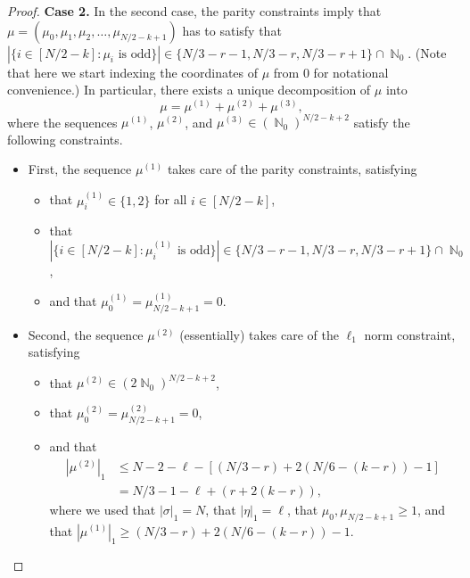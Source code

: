 \documentclass[11pt]{article}
\numberwithin{equation}{section}
\DeclareMathOperator{\N}{\mathbb{N}} %
\theoremstyle{definition}
\begin{document}
\begin{proof}
\textbf{Case 2.} 
In the second case, 
the parity constraints imply that
$\mu = (\mu_{0}, \mu_{1}, \mu_{2}, \ldots, \mu_{N/2 - k + 1})$ 
has to satisfy that 
$|\{ i \in [N/2 - k] : \mu_{i} \text{ is odd} \}| \in \{N/3 - r - 1, N/3 - r, N/3 - r + 1 \} \cap \N_{0}$. 
(Note that here we start indexing the coordinates of $\mu$ from $0$ for notational convenience.) 
In particular, 
there exists a unique decomposition of $\mu$ into 
\[
\mu = \mu^{(1)} + \mu^{(2)} + \mu^{(3)},
\]
where the sequences $\mu^{(1)}$, $\mu^{(2)}$, and $\mu^{(3)} \in (\N_0)^{N/2-k+2}$  satisfy the following constraints.
\begin{itemize}
\item First, the sequence $\mu^{(1)}$ takes care of the parity constraints, satisfying 
\begin{itemize}
\item that $\mu^{(1)}_{i} \in \{1,2\}$ for all $i \in [N/2-k]$, 
\item that 
$|\{ i \in [N/2 - k] : \mu^{(1)}_{i} \text{ is odd} \}| 
\in \{ N/3 - r - 1, N/3 - r, N/3 - r + 1 \} \cap \N_{0}$,
\item and that 
$\mu^{(1)}_{0} = \mu^{(1)}_{N/2-k+1} = 0$.
\end{itemize}

\item Second, the sequence $\mu^{(2)}$ (essentially) takes care of the $\ell_{1}$ norm constraint, satisfying 
\begin{itemize}
    \item that 
$\mu^{(2)} \in (2 \N_{0})^{N/2-k+2}$, 
    \item that 
$\mu^{(2)}_{0} = \mu^{(2)}_{N/2-k+1} = 0$, 
    \item and that 
\begin{align*}
|\mu^{(2)}|_{1} 
&\leq 
N - 2 - \ell - [(N/3 - r) + 2(N/6 - (k-r)) - 1] \\
&= N/3 - 1 - \ell + (r + 2(k-r)),
\end{align*}
where we used that 
$|\sigma|_{1} = N$, 
that $|\eta|_{1} = \ell$, 
that $\mu_{0}, \mu_{N/2 - k + 1} \geq 1$, 
and that $|\mu^{(1)}|_{1} \geq (N/3 - r) + 2(N/6 - (k-r)) - 1$. 
\end{itemize}




\end{itemize}
\end{proof}
\end{document}
